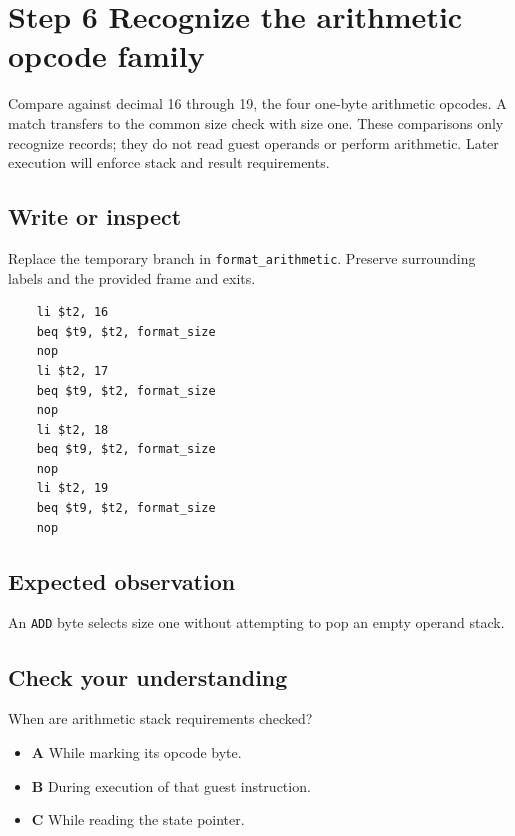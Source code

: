 \section{Step 6 Recognize the arithmetic opcode family}\label{vm-s06}

Compare against decimal 16 through 19, the four one-byte arithmetic opcodes. A match transfers to the common size check with size one. These comparisons only recognize records; they do not read guest operands or perform arithmetic. Later execution will enforce stack and result requirements.

\subsection{Write or inspect}
Replace the temporary branch in \texttt{format\_arithmetic}. Preserve surrounding labels and the provided frame and exits.

\begin{verbatim}
    li $t2, 16
    beq $t9, $t2, format_size
    nop
    li $t2, 17
    beq $t9, $t2, format_size
    nop
    li $t2, 18
    beq $t9, $t2, format_size
    nop
    li $t2, 19
    beq $t9, $t2, format_size
    nop
\end{verbatim}
\subsection{Expected observation}
An \texttt{ADD} byte selects size one without attempting to pop an empty operand stack.

\subsection{Check your understanding}
When are arithmetic stack requirements checked?

\begin{itemize}
  \item \textbf{A} While marking its opcode byte.
  \item \textbf{B} During execution of that guest instruction.
  \item \textbf{C} While reading the state pointer.
\end{itemize}
